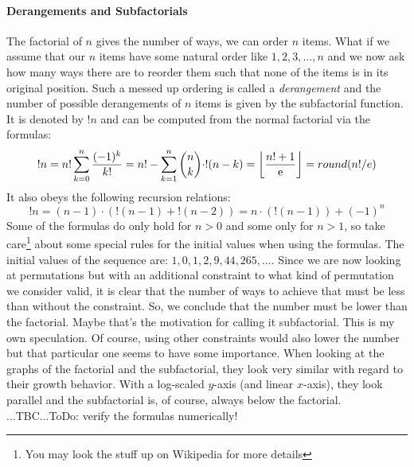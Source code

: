 \paragraph{Derangements and Subfactorials}
The factorial of $n$ gives the number of ways, we can order $n$ items. What if we assume that our $n$ items have some natural order like $1,2,3,\ldots,n$ and we now ask how many ways there are to reorder them such that none of the items is in its original position. Such a messed up ordering is called a \emph{derangement} and the number of possible derangements of $n$ items is given by the subfactorial function. It is denoted by $!n$ and can be computed from the normal factorial via the formulas: 
\begin{equation}
!n = n! \sum_{k=0}^{n} \frac{(-1)^k}{k!} 
   = n! - \sum_{k=1}^{n} \binom{n}{k} \cdot !(n-k)
   = \floor*{ \frac{n! + 1}{\e} }
   = round(n! / e)
\end{equation}
It also obeys the following recursion relations:
\begin{equation}
!n = (n-1) \cdot (!(n-1) + !(n-2))
   = n \cdot (!(n-1)) + (-1)^n
\end{equation}
Some of the formulas do only hold for $n > 0$ and some only for $n > 1$, so take care\footnote{You may look the stuff up on Wikipedia for more details} about some special rules for the initial values when using the formulas. The initial values of the sequence are: $1,0,1,2,9,44,265,\ldots$. Since we are now looking at permutations but with an additional constraint to what kind of permutation we consider valid, it is clear that the number of ways to achieve that must be less than without the constraint. So, we conclude that the number must be lower than the factorial. Maybe that's the motivation for calling it subfactorial. This is my own speculation. Of course, using other constraints would also lower the number but that particular one seems to have some importance. When looking at the graphs of the factorial and the subfactorial, they look very similar with regard to their growth behavior. With a log-scaled $y$-axis (and linear $x$-axis), they look parallel and the subfactorial is, of course, always below the factorial. ...TBC...ToDo: verify the formulas numerically!





